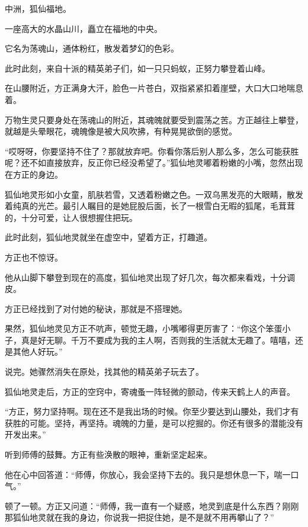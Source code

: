 
\begin{this_body}



中洲，狐仙福地。

一座高大的水晶山川，矗立在福地的中央。

它名为荡魂山，通体粉红，散发着梦幻的色彩。

此时此刻，来自十派的精英弟子们，如一只只蚂蚁，正努力攀登着山峰。

在山腰附近，方正满身大汗，脸色一片苍白，双指紧紧扣着崖壁，大口大口地喘息着。

万物生灵只要身处在荡魂山的附近，其魂魄就要受到震荡之苦。方正越往上攀登，就越是头晕眼花，魂魄像是被大风吹拂，有种晃晃欲倒的感觉。

“哎呀呀，你要坚持不住了？那就放弃吧。你看你落后别人那么多，怎么可能获胜呢？还不如直接放弃，反正你已经没希望了。”狐仙地灵嘟着粉嫩的小嘴，忽然出现在方正的身边。

狐仙地灵形如小女童，肌肤若雪，又透着粉嫩之色。一双乌黑发亮的大眼睛，散发着纯真的光芒。最引人瞩目的是她屁股后面，长了一根雪白无暇的狐尾，毛茸茸的，十分可爱，让人很想握住把玩。

此时此刻，狐仙地灵就坐在虚空中，望着方正，打趣道。

方正也不惊讶。

他从山脚下攀登到现在的高度，狐仙地灵出现了好几次，每次都来看戏，十分调皮。

方正已经找到了对付她的秘诀，那就是不搭理她。

果然，狐仙地灵见方正不吭声，顿觉无趣，小嘴嘟得更厉害了：“你这个笨蛋小子，真是好无聊。千万不要成为我的主人啊，否则我的生活就太无趣了。嘻嘻，还是其他人好玩。”

说完。她骤然消失在原处，找其他的精英弟子玩去了。

狐仙地灵走后，方正的空窍中，寄魂蚤一阵轻微的颤动，传来天鹤上人的声音。

“方正，努力坚持啊。现在还不是我出场的时候。你至少要达到山腰处，我们才有获胜的可能。坚持，再坚持。魂魄的力量，是可以挖掘的。你还有很多的潜能没有开发出来。”

听到师傅的鼓舞。方正有些涣散的眼神，重新坚定起来。

他在心中回答道：“师傅，你放心，我会坚持下去的。我只是想休息一下，喘一口气。”

顿了一顿。方正又问道：“师傅，我一直有一个疑惑，地灵到底是什么东西？刚刚那狐仙地灵就在我的身边，你说我一把捉住她，是不是就不用再攀山了？”


\end{this_body}
